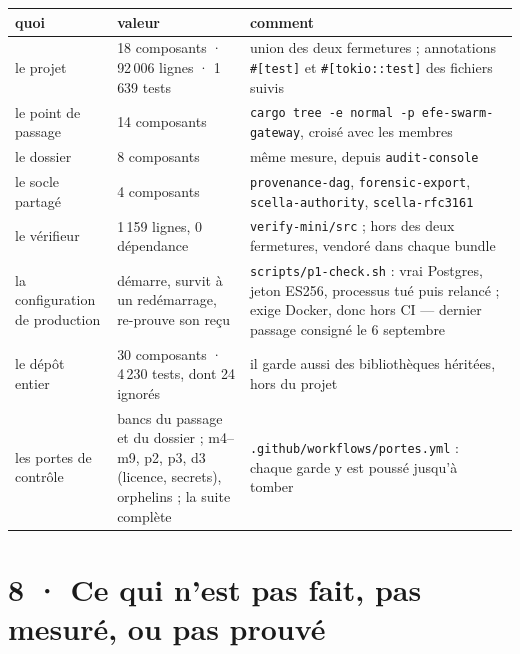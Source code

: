\documentclass[10pt]{extarticle}
\newcommand{\code}[1]{\texttt{\small #1}}
\begin{document}
{\small
\renewcommand{\arraystretch}{1.13}
\begin{longtable}{@{}L{4.4cm}L{5.4cm}L{7.7cm}@{}}
\toprule
\textbf{quoi} & \textbf{valeur} & \textbf{comment} \\ \midrule \endhead
le projet & 18 composants · 92\,006 lignes · 1\,639 tests & union des deux fermetures ; annotations \code{\#[test]} et
\code{\#[tokio::test]} des fichiers suivis \\
le point de passage & 14 composants & \code{cargo tree -e normal -p efe-swarm-gateway}, croisé avec les membres \\
le dossier & 8 composants & même mesure, depuis \code{audit-console} \\
le socle partagé & 4 composants & \code{provenance-dag}, \code{forensic-export}, \code{scella-authority},
\code{scella-rfc3161} \\
le vérifieur & 1\,159 lignes, 0 dépendance & \code{verify-mini/src} ; hors des deux fermetures, vendoré dans chaque
bundle \\
la configuration de production & démarre, survit à un redémarrage, re-prouve son reçu & \code{scripts/p1-check.sh}
: vrai Postgres, jeton ES256, processus tué puis relancé ; exige Docker, donc hors CI --- dernier passage consigné
le 6 septembre \\
le dépôt entier & 30 composants · 4\,230 tests, dont 24 ignorés & il garde aussi des bibliothèques héritées, hors du
projet \\
les portes de contrôle & bancs du passage et du dossier ; m4--m9, p2, p3, d3 (licence, secrets), orphelins ; la suite
complète & \code{.github/workflows/portes.yml} : chaque garde y est poussé jusqu'à tomber \\
\bottomrule
\end{longtable}
}

\section{8 · Ce qui n'est pas fait, pas mesuré, ou pas prouvé}
\end{document}
